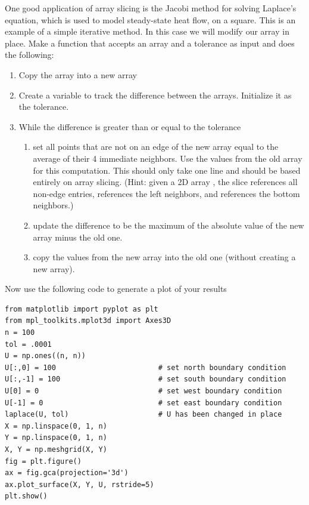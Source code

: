 \begin{problem}
One good application of array slicing is the Jacobi method for solving Laplace's equation, which is used to model steady-state heat flow, on a square.
This is an example of a simple iterative method.
In this case we will modify our array in place.
Make a function that accepts an array and a tolerance as input and does the following:
\begin{enumerate}
\item Copy the array into a new array
\item Create a variable to track the difference between the arrays.
Initialize it as the tolerance.
\item While the difference is greater than or equal to the tolerance
\begin{enumerate}
	\item set all points that are not on an edge of the new array equal to the average of 
    their 4 immediate neighbors.
    Use the values from the old array for this computation.
    This should only take one line and should be based entirely on array slicing.
    (Hint: given a 2D array , the slice  references all non-edge 
    entries,  references the left neighbors, and  
    references the bottom neighbors.)
	\item update the difference to be the maximum of the absolute value of the new array minus the old one.
	\item copy the values from the new array into the old one (without creating a new array).
\end{enumerate}
\end{enumerate}

Now use the following code to generate a plot of your results
\begin{lstlisting}
from matplotlib import pyplot as plt
from mpl_toolkits.mplot3d import Axes3D
n = 100
tol = .0001
U = np.ones((n, n))
U[:,0] = 100                        # set north boundary condition
U[:,-1] = 100                       # set south boundary condition
U[0] = 0                            # set west boundary condition
U[-1] = 0                           # set east boundary condition
laplace(U, tol)                     # U has been changed in place
X = np.linspace(0, 1, n)
Y = np.linspace(0, 1, n)
X, Y = np.meshgrid(X, Y)
fig = plt.figure()
ax = fig.gca(projection='3d')
ax.plot_surface(X, Y, U, rstride=5)
plt.show()
\end{lstlisting}


\end{problem}
